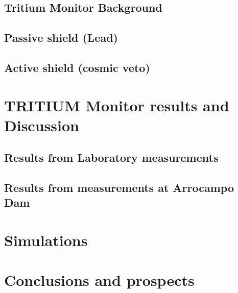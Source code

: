 \documentclass[12pt,a4paper]{book}
\begin{document}
	\section{Tritium Monitor Background}
	\newpage
		
	\section{Passive shield (Lead)}
	\newpage	
	
	\section{Active shield (cosmic veto)}
	\newpage
	
\chapter{TRITIUM Monitor results and Discussion}\label{chap:Results}
	\section{Results from Laboratory measurements}
	\newpage
		
	\section{Results from measurements at Arrocampo Dam}
	\newpage	

\chapter{Simulations}  \label{chap:Simulations}
%
\newpage	

\chapter{Conclusions and prospects}  \label{chap:Conclusions}
%
\newpage



%
	
\end{document}
